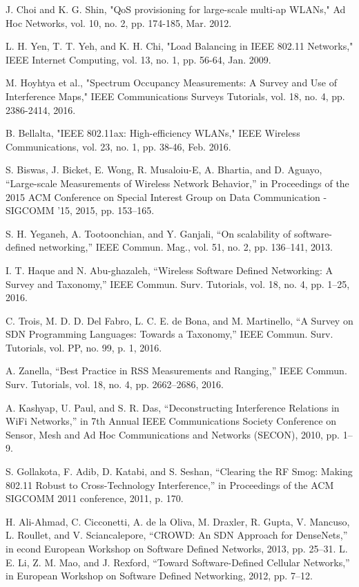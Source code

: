 \begin{thebibliography}{1}
 J. Choi and K. G. Shin, "QoS provisioning for large-scale multi-ap WLANs," Ad Hoc Networks, vol. 10, no. 2, pp. 174-185, Mar. 2012.

 L. H. Yen, T. T. Yeh, and K. H. Chi, "Load Balancing in IEEE 802.11 Networks," IEEE Internet Computing, vol. 13, no. 1, pp. 56-64, Jan. 2009.

 M. Hoyhtya et al., "Spectrum Occupancy Measurements: A Survey and Use of Interference Maps," IEEE Communications Surveys Tutorials, vol. 18, no. 4, pp. 2386-2414, 2016.

 B. Bellalta, "IEEE 802.11ax: High-efficiency WLANs," IEEE Wireless Communications, vol. 23, no. 1, pp. 38-46, Feb. 2016.


 S. Biswas, J. Bicket, E. Wong, R. Musaloiu-E, A. Bhartia, and D. Aguayo, “Large-scale Measurements of Wireless Network Behavior,” in Proceedings of the 2015 ACM Conference on Special Interest Group on Data Communication - SIGCOMM ’15, 2015, pp. 153–165.


 S. H. Yeganeh, A. Tootoonchian, and Y. Ganjali, “On scalability of software-defined networking,” IEEE Commun. Mag., vol. 51, no. 2, pp. 136–141, 2013.

 I. T. Haque and N. Abu-ghazaleh, “Wireless Software Defined Networking: A Survey and Taxonomy,” IEEE Commun. Surv. Tutorials, vol. 18, no. 4, pp. 1–25, 2016.

 C. Trois, M. D. D. Del Fabro, L. C. E. de Bona, and M. Martinello, “A Survey on SDN Programming Languages: Towards a Taxonomy,” IEEE Commun. Surv. Tutorials, vol. PP, no. 99, p. 1, 2016.

 A. Zanella, “Best Practice in RSS Measurements and Ranging,” IEEE Commun. Surv. Tutorials, vol. 18, no. 4, pp. 2662–2686, 2016.

 A. Kashyap, U. Paul, and S. R. Das, “Deconstructing Interference Relations in WiFi Networks,” in 7th Annual IEEE Communications Society Conference on Sensor, Mesh and Ad Hoc Communications and Networks (SECON), 2010, pp. 1–9.

 S. Gollakota, F. Adib, D. Katabi, and S. Seshan, “Clearing the RF Smog: Making 802.11 Robust to Cross-Technology Interference,” in Proceedings of the ACM SIGCOMM 2011 conference, 2011, p. 170.


 H. Ali-Ahmad, C. Cicconetti, A. de la Oliva, M. Draxler, R. Gupta, V. Mancuso, L. Roullet, and V. Sciancalepore, “CROWD: An SDN Approach for DenseNets,” in econd European Workshop on Software Defined Networks, 2013, pp. 25–31.
 L. E. Li, Z. M. Mao, and J. Rexford, “Toward Software-Defined Cellular Networks,” in European Workshop on Software Defined Networking, 2012, pp. 7–12.


\end{thebibliography}
